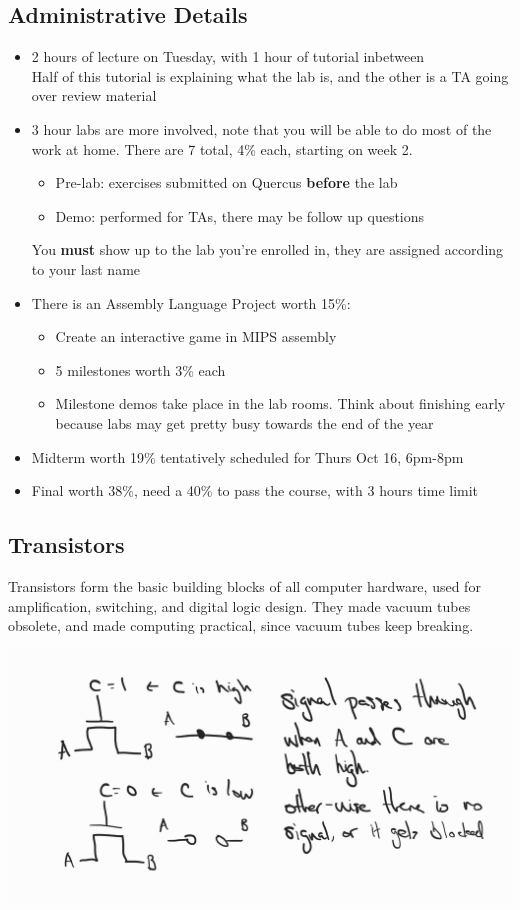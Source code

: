 \subsection{Administrative Details}
\begin{itemize}
\item 2 hours of lecture on Tuesday, with 1 hour of tutorial inbetween \\
Half of this tutorial is explaining what the lab is, and the other is a TA going over review material
\item 3 hour labs are more involved, note that you will be able to do most of the work at home. There are 7 total, 4\% each, starting on week 2. 
    \begin{itemize}
    \item Pre-lab: exercises submitted on Quercus \textbf{before} the lab
    \item Demo: performed for TAs, there may be follow up questions
    \end{itemize}
    You \textbf{must} show up to the lab you're enrolled in, they are assigned according to your last name
\item There is an Assembly Language Project worth 15\%:
    \begin{itemize}
    \item Create an interactive game in MIPS assembly
    \item 5 milestones worth 3\% each
    \item Milestone demos take place in the lab rooms. Think about finishing early because labs may get pretty busy towards the end of the year
    \end{itemize}
\item Midterm worth 19\% tentatively scheduled for Thurs Oct 16, 6pm-8pm
\item Final worth 38\%, need a 40\% to pass the course, with 3 hours time limit
\end{itemize}

\subsection{Transistors}

Transistors form the basic building blocks of all computer hardware, used for amplification, switching, and digital logic design. They made vacuum tubes obsolete, and made computing practical, since vacuum tubes keep breaking.

\includegraphics{csc258/figures/transistor.jpg}

